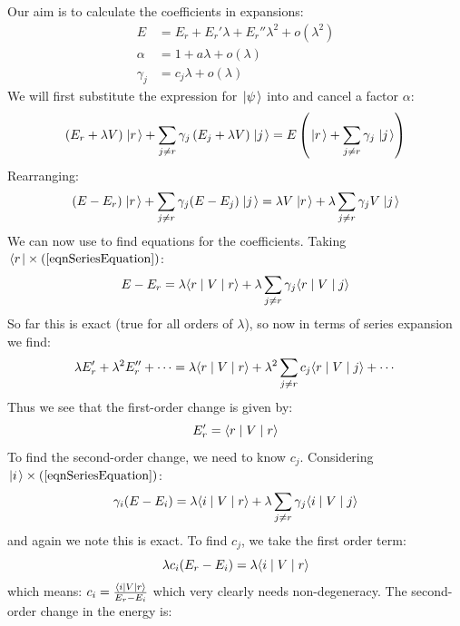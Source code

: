 \documentclass[../Main.tex]{subfiles}
\begin{document}
Our aim is to calculate the coefficients in expansions:
\begin{align*}
    E &= E_r + E_r' \lambda + E_r'' \lambda^2 + o(\lambda^2) \\
    \alpha &= 1 + a\lambda + o(\lambda) \\
    \gamma_j &= c_j \lambda + o(\lambda)
\end{align*}
We will first substitute the expression for $\left.\left|\psi\right.\right\rangle$ into  and cancel a factor $\alpha$:
\begin{equation*}
    \left(E_r + \lambda V\right) \left.\left|r\right.\right\rangle + \sum_{j \neq r} \gamma_j \left(E_j + \lambda V\right) \left.\left|j\right.\right\rangle = E \left(\left.\left|r\right.\right\rangle + \sum_{j \neq r} \gamma_j \left.\left|j\right.\right\rangle\right)
\end{equation*}
Rearranging:
\begin{equation}
    (E - E_r) \left.\left|r\right.\right\rangle + \sum_{j \neq r} \gamma_j (E - E_j) \left.\left|j\right.\right\rangle = \lambda V \left.\left|r\right.\right\rangle + \lambda \sum_{j \neq r} \gamma_j V \left.\left|j\right.\right\rangle
    \label{eqnSeriesEquation}
\end{equation}
We can now use  to find equations for the coefficients. Taking $\left.\left\langle r\right.\right| \times (\text{\ref{eqnSeriesEquation}})$:
\begin{equation*}
    E - E_r = \lambda \langle r\mid V\mid r\rangle + \lambda \sum_{j \neq r} \gamma_j \langle r\mid V\mid j\rangle
\end{equation*}
So far this is exact (true for all orders of $\lambda$), so now in terms of series expansion we find:
\begin{equation*}
    \lambda E_r' + \lambda^2 E_r'' + \cdots = \lambda \langle r\mid V\mid r\rangle + \lambda^2 \sum_{j \neq r}c_j \langle r\mid V\mid j\rangle + \cdots
\end{equation*}
Thus we see that the first-order change is given by:
\begin{equation*}
    E'_r = \langle r\mid V\mid r\rangle
\end{equation*}
To find the second-order change, we need to know $c_j$. Considering $\left.\left|i\right.\right\rangle \times (\text{\ref{eqnSeriesEquation}})$:
\begin{equation*}
    \gamma_i (E - E_i) = \lambda\langle i\mid V\mid r\rangle + \lambda \sum_{j \neq r} \gamma_j \langle i\mid V\mid j\rangle
\end{equation*}
and again we note this is exact. To find $c_j$, we take the first order term:
\begin{equation*}
    \lambda c_i (E_r - E_i) = \lambda \langle i\mid V\mid r\rangle
\end{equation*}
which means: $c_i = \frac{\langle i\mid V\mid r\rangle}{E_r - E_i}$ which very clearly needs non-degeneracy. The second-order change in the energy is:
\end{document}
